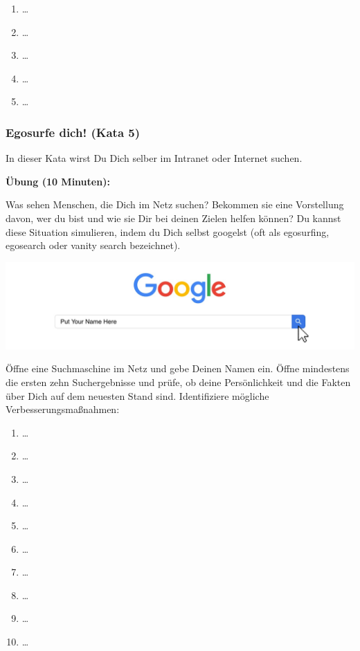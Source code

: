 \documentclass[
  ngerman,
  paper=a4,
,captions=tableheading
]{scrartcl}
\providecommand{\tightlist}{%
  \setlength{\itemsep}{0pt}\setlength{\parskip}{0pt}}
\begin{document}
\begin{enumerate}
\def\labelenumi{\arabic{enumi}.}
\tightlist
\item
  \ldots{}
\item
  \ldots{}
\item
  \ldots{}
\item
  \ldots{}
\item
  \ldots{}
\end{enumerate}

\hypertarget{egosurfe-dich-kata-5}{%
\subsubsection{Egosurfe dich! (Kata 5)}\label{egosurfe-dich-kata-5}}

In dieser Kata wirst Du Dich selber im Intranet oder Internet suchen.

\textbf{Übung (10 Minuten):}

Was sehen Menschen, die Dich im Netz suchen? Bekommen sie eine
Vorstellung davon, wer du bist und wie sie Dir bei deinen Zielen helfen
können? Du kannst diese Situation simulieren, indem du Dich selbst
googelst (oft als egosurfing, egosearch oder vanity search bezeichnet).

\includegraphics{./tex2pdf.-c0ed5a8631023970/da4901626a83ec7029c76ad718e7f83d3f629d0f.png}

Öffne eine Suchmaschine im Netz und gebe Deinen Namen ein. Öffne
mindestens die ersten zehn Suchergebnisse und prüfe, ob deine
Persönlichkeit und die Fakten über Dich auf dem neuesten Stand sind.
Identifiziere mögliche Verbesserungsmaßnahmen:

\begin{enumerate}
\def\labelenumi{\arabic{enumi}.}
\tightlist
\item
  \ldots{}
\item
  \ldots{}
\item
  \ldots{}
\item
  \ldots{}
\item
  \ldots{}
\item
  \ldots{}
\item
  \ldots{}
\item
  \ldots{}
\item
  \ldots{}
\item
  \ldots{}
\end{enumerate}
\end{document}
